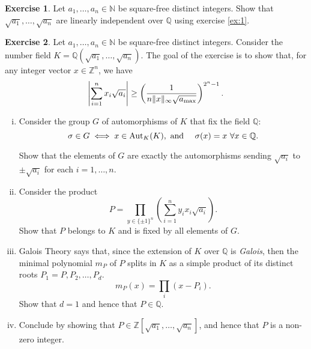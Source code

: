 \documentclass[12pt,a4paper]{article}
\theoremstyle{plain}
\newtheorem*{Sol*}{Solution}
\theoremstyle{definition}
\newtheorem{Ex}{Exercise}
\def \N {\mathbb N}
\def \Q {\mathbb Q}
\def \Z {\mathbb Z}
\newif\ifsolutions
\newcommand{\exercise}[2]{
			\begin{Ex} #1 \end{Ex}
			\ifsolutions  \begin{Sol*} #2 \end{Sol*} \bigskip \else \bigskip  \fi
		}
\begin{document}
\exercise{
	Let $a_1, \dots, a_n \in \N$ be square-free distinct integers. Show that $\sqrt{a_1}, \dots, \sqrt{a_n}$ are linearly independent over $\Q$ using exercise \ref{ex:1}.
}{}

\exercise{
	Let $a_1, \dots, a_n \in \N$ be square-free distinct integers. 
	Consider the number field $K = \Q(\sqrt{a_1}, \dots, \sqrt{a_n})$.
	The goal of the exercise is to show that, for any integer vector $x \in \Z^n$, we have
		\[ \left| \sum_{i=1}^n x_i \sqrt{a_i}  \right| \geq \left( \frac{1}{n \| x \|_\infty \sqrt{a_{\rm max}} } \right)^{2^n - 1}. \]

	\begin{enumerate}[i)]
		\item 
		Consider the group $G$ of automorphisms of $K$ that fix the field $\Q$:
			\[ \sigma \in G \iff x\in{\rm Aut}_K(K), \text{ and } \quad \sigma(x) = x \ \forall x \in \Q.\]

		Show that the elements of $G$ are exactly the automorphisms sending $\sqrt{a_i}$ to $\pm \sqrt{a_i}$ for each $i=1, \dots, n$.

		\item Consider the product 
			\[ P = \prod_{y \in \{ \pm 1\}^n} \left( \sum_{i=1}^n y_i x_i \sqrt{a_i} \right). \]
		Show that $P$ belongs to $K$ and is fixed by all elements of $G$.

		\item Galois Theory says  that, since the extension of $K$ over $\Q$ is \emph{Galois}, then the minimal polynomial $m_P$ of $P$ splits in $K$ as a simple product of its distinct roots $P_1=P, P_2, \dots, P_d$.
			\[ m_P(x) = \prod_i \left(x - P_i \right). \]
		Show that $d=1$ and hence that $P \in \Q$.

		\item Conclude by showing that $P \in \Z[\sqrt{a_1}, \dots, \sqrt{a_n}]$, and hence that $P$ is a non-zero integer.
	\end{enumerate}
}{}
\end{document}
